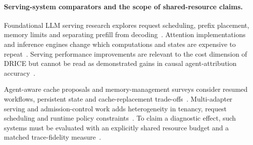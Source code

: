 \paragraph{Serving-system comparators and the scope of shared-resource claims.}
Foundational LLM serving research explores request scheduling, prefix placement, memory limits and separating prefill from decoding~\cite{ext040,ext042,ext049,ext050}.
Attention implementations and inference engines change which computations and states are expensive to repeat~\cite{ext149,ext150,ext151}.
Serving performance improvements are relevant to the cost dimension of DRICE but cannot be read as demonstrated gains in causal agent-attribution accuracy~\cite{ext152,ext147,ext148}.

Agent-aware cache proposals and memory-management surveys consider resumed workflows, persistent state and cache-replacement trade-offs~\cite{ext025,ext026,ext027}.
Multi-adapter serving and admission-control work adds heterogeneity in tenancy, request scheduling and runtime policy constraints~\cite{ext028,ext051}.
To claim a diagnostic effect, such systems must be evaluated with an explicitly shared resource budget and a matched trace-fidelity measure~\cite{ext052,ext064}.

